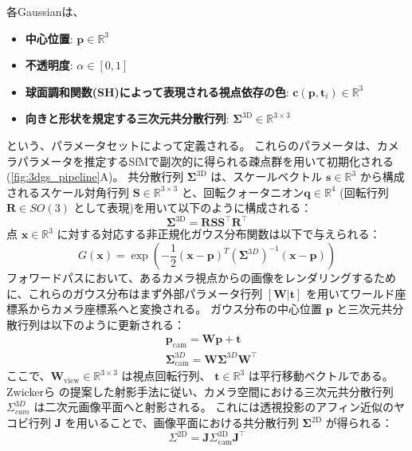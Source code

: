 各Gaussianは、
\begin{itemize}
  \item \textbf{中心位置}: $\bm{p} \in \mathbb{R}^3$
  \item \textbf{不透明度}: $\alpha \in [0, 1]$
  \item \textbf{球面調和関数(SH)によって表現される視点依存の色}: $\bm{c}(\bm{p}, \bm{t}_i) \in \mathbb{R}^{3}$
  \item \textbf{向きと形状を規定する三次元共分散行列}: $\bm{\Sigma}^{\mathrm{3D}} \in \mathbb{R}^{3 \times 3}$ 
\end{itemize}
という、パラメータセットによって定義される。
これらのパラメータは、カメラパラメータを推定するSfMで副次的に得られる疎点群を用いて初期化される(\cref{fig:3dgs_pipeline}A)。
共分散行列 $\bm{\Sigma}^{\mathrm{3D}}$ は、スケールベクトル $\bm{s} \in \mathbb{R}^3$ から構成されるスケール対角行列 $\bm{S} \in \mathbb{R}^{3 \times 3}$ と、回転クォータニオン$\bm{q} \in \mathbb{R}^4$ (回転行列 $\bm{R} \in SO(3)$ として表現)を用いて以下のように構成される：
\begin{equation}\label{eq:3dgs-sigma_RssR}
  \bm{\Sigma}^{\mathrm{3D}} = \bm{R} \bm{S} \bm{S}^\top \bm{R}^\top
\end{equation}
点 $\bm{x} \in \mathbb{R}^3$ に対する対応する非正規化ガウス分布関数は以下で与えられる：
\begin{equation}\label{eq:3dgs-G(x)}
  G(\bm{x}) = 
    \exp \left( -\frac{1}{2} (\bm{x} - \bm{p})^T \left({\bm{\Sigma}^{3D}}\right)^{-1} (\bm{x} - \bm{p}) \right)
\end{equation}
フォワードパスにおいて、あるカメラ視点からの画像をレンダリングするために、これらのガウス分布はまず外部パラメータ行列 $[\bm{W} | \bm{t}]$ を用いてワールド座標系からカメラ座標系へと変換される。
ガウス分布の中心位置 $\bm{p}$ と三次元共分散行列は以下のように更新される：
\begin{align*}
  &\bm{p}_\mathrm{cam} = \bm{W}\bm{p} + \bm{t} \\
  &\bm{\Sigma}^{3D}_\mathrm{cam} = \bm{W} \bm{\Sigma}^{3D} \bm{W}^\top
\end{align*} 
ここで、$\bm{W}_\mathrm{view} \in \mathbb{R}^{3 \times 3}$ は視点回転行列、
$\bm{t} \in \mathbb{R}^3$ は平行移動ベクトルである。
Zwickerら\cite{Zwicker2001_EWA-volume-splatting} の提案した射影手法に従い、カメラ空間における三次元共分散行列 $\Sigma_{cam}^{3D}$ は二次元画像平面へと射影される。
これには透視投影のアフィン近似のヤコビ行列 $\bm{J}$ を用いることで、画像平面における共分散行列 $\bm{\Sigma}^{\mathrm{2D}}$ が得られる：
\begin{equation}\label{eq:3dgs-affine-projection}
\Sigma^\mathrm{2D} = \bm{J} \Sigma^{\mathrm{3D}}_\mathrm{cam} \bm{J}^\top
\end{equation}
